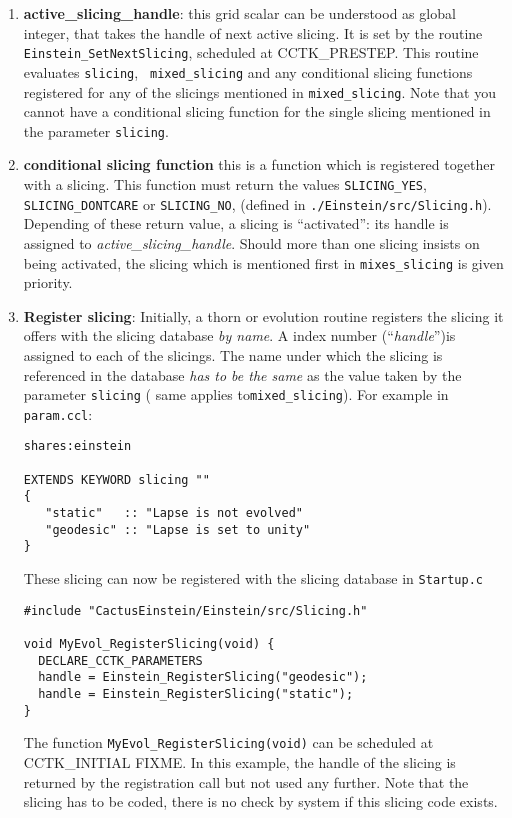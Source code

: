 \documentclass{article}
\begin{document}
\begin{enumerate}
\item{\bf active\_slicing\_handle}: this grid scalar can be understood
as global integer, that takes the handle of next active slicing. It is 
set by the routine {\tt  Einstein\_SetNextSlicing}, scheduled at
CCTK\_PRESTEP. This routine evaluates {\tt slicing}, {\tt
mixed\_slicing} and any conditional slicing functions registered
for any of the slicings mentioned in  {\tt mixed\_slicing}. Note that
you cannot have a conditional slicing function for the single slicing mentioned 
in the parameter {\tt slicing}.

\item{\bf conditional slicing function} this is a function which is
registered together with a slicing. This function must return the values
{\tt SLICING\_YES}, {\tt SLICING\_DONTCARE} or {\tt SLICING\_NO}, (defined
in {\tt ./Einstein/src/Slicing.h}). Depending of these return value, a 
slicing is ``activated'': its handle is assigned to {\em
active\_slicing\_handle}. Should more than one slicing insists on being
activated, the slicing which is mentioned first in {\tt mixes\_slicing} 
is given priority.

\item{\bf Register slicing}: Initially, a thorn or evolution routine
registers the slicing it offers with the slicing database {\em by name}.
A index number (``{\em handle}'')is assigned to each of the
slicings. The name under which the slicing is referenced in the
database {\em has to be the same} as the value taken by the parameter
{\tt slicing} ( same applies to{\tt mixed\_slicing}). For example in {\tt param.ccl}: 
\begin{verbatim}
shares:einstein

EXTENDS KEYWORD slicing ""
{
   "static"   :: "Lapse is not evolved"
   "geodesic" :: "Lapse is set to unity"
}
\end{verbatim}
These slicing can now be registered with the slicing database in {\tt Startup.c}

\begin{verbatim}
#include "CactusEinstein/Einstein/src/Slicing.h"

void MyEvol_RegisterSlicing(void) {
  DECLARE_CCTK_PARAMETERS
  handle = Einstein_RegisterSlicing("geodesic");
  handle = Einstein_RegisterSlicing("static");
}
\end{verbatim}
The function {\tt MyEvol\_RegisterSlicing(void)} can be scheduled at CCTK\_INITIAL
FIXME. In this example,  the handle of the slicing is returned by the
registration call but
not used any further. Note that the slicing has to be coded, there is
no check by system if this slicing code exists.


\end{enumerate}
\end{document}
